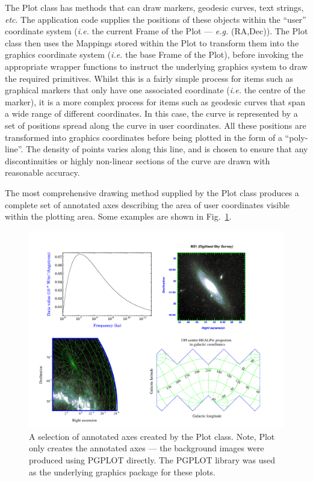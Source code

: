 \documentclass[final,authoryear,5p,times,twocolumn]{elsarticle}
\begin{document}
The Plot class has methods that can draw markers, geodesic curves, text
strings, \emph{etc}. The application code supplies the positions of these
objects within the ``user'' coordinate system (\emph{i.e.} the current
Frame of the Plot --- \emph{e.g.} (RA,Dec)). The Plot class then uses the
Mappings stored within the Plot to transform them into the graphics
coordinate system (\emph{i.e.} the base Frame of the Plot), before
invoking the appropriate wrapper functions to instruct the underlying
graphics system to draw the required primitives. Whilst this is a fairly
simple process for items such as graphical markers that only have one
associated coordinate (\emph{i.e.} the centre of the marker), it is a
more complex process for items such as geodesic curves that span a wide
range of different coordinates. In this case, the curve is represented by
a set of positions spread along the curve in user coordinates. All these
positions are transformed into graphics coordinates before being plotted
in the form of a ``poly-line''. The density of points varies along this
line, and is chosen to ensure that any discontinuities or highly
non-linear sections of the curve are drawn with reasonable accuracy.

The most comprehensive drawing method supplied by the Plot class produces
a complete set of annotated axes describing the area of user coordinates
visible within the plotting area. Some examples are shown in
Fig.~\ref{fig:2dplots}.

\begin{figure}[h]
\centering
\includegraphics[width=\textwidth]{2dplots}
\caption{A selection of annotated axes created by the Plot class. Note,
Plot only creates the annotated axes --- the background images were
produced using PGPLOT directly. The PGPLOT library was used as the
underlying graphics package for these plots.}
\label{fig:2dplots}
\end{figure}
\end{document}
